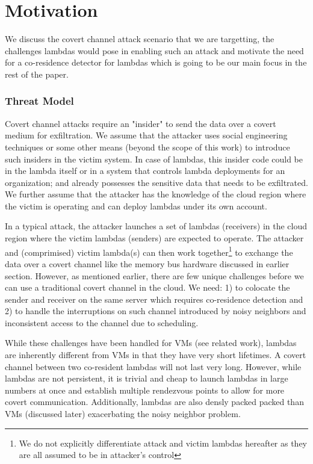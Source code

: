 
\section{Motivation}
\label{sec:attackstrategy}

We discuss the covert channel attack scenario that we are targetting, the challenges 
lambdas would pose in enabling such an attack and motivate the need for a 
co-residence detector for lambdas which is going to be our main focus in the rest of 
the paper. 

\subsubsection{Threat Model}
Covert channel attacks require an "insider" to send the data over a covert 
medium for exfiltration. We assume that the attacker uses social engineering 
techniques or some other means (beyond the scope of this work) to introduce  
such insiders in the victim system. In case of lambdas, this insider code could be 
in the lambda itself or in a system that controls lambda deployments for an 
organization; and already possesses the sensitive data that needs to be exfiltrated. 
We further assume that the attacker has the knowledge of the cloud region 
where the victim is operating and can deploy lambdas under its own account.

In a typical attack, the attacker launches a set of  lambdas (receivers) in the 
cloud region where the victim lambdas 
(senders) are expected to operate. The attacker and 
(comprimised) victim lambda(s) can then work together\footnote{We do not explicitly
differentiate attack and victim lambdas hereafter as they are all assumed 
to be in attacker's control} to exchange the data over 
a covert channel like the memory bus hardware discussed in earlier section.
However, as mentioned earlier, there are few unique challenges before we can use
a traditional covert channel in the cloud. We need: 1) to colocate the sender 
and receiver on the same server which requires co-residence detection and 2) to handle
the interruptions on such channel introduced by noisy neighbors and inconsistent 
access to the channel due to scheduling.

While these challenges have been handled for VMs (see related work), lambdas are
inherently different from VMs in that they have very short lifetimes. A covert
channel between two co-resident lambdas will not last very long. However, while
lambdas are not persistent, it is trivial and cheap to launch lambdas in large numbers at
once and establish multiple rendezvous points to allow for more covert communication.
Additionally, lambdas are also densly packed packed than VMs (discussed later) 
exacerbating the noisy neighbor problem.

